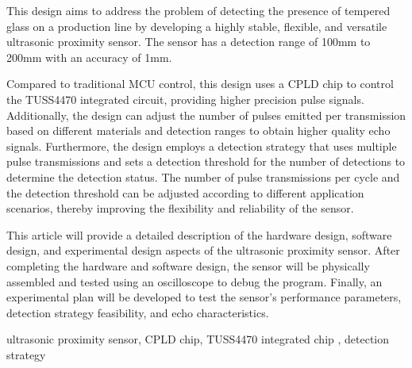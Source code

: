 \begin{EnAbstract}
    

This design aims to address the problem of detecting the presence of tempered glass on a production line by developing a highly stable, flexible, and versatile ultrasonic proximity sensor. The sensor has a detection range of 100mm to 200mm with an accuracy of 1mm.\par
Compared to traditional MCU control, this design uses a CPLD chip to control the TUSS4470 integrated circuit, providing higher precision pulse signals. Additionally, the design can adjust the number of pulses emitted per transmission based on different materials and detection ranges to obtain higher quality echo signals. Furthermore, the design employs a detection strategy that uses multiple pulse transmissions and sets a detection threshold for the number of detections to determine the detection status. The number of pulse transmissions per cycle and the detection threshold can be adjusted according to different application scenarios, thereby improving the flexibility and reliability of the sensor.\par
This article will provide a detailed description of the hardware design, software design, and experimental design aspects of the ultrasonic proximity sensor. After completing the hardware and software design, the sensor will be physically assembled and tested using an oscilloscope to debug the program. Finally, an experimental plan will be developed to test the sensor's performance parameters, detection strategy feasibility, and echo characteristics.
  
  
    \EnglishKeyWord ultrasonic proximity sensor, CPLD chip, TUSS4470 integrated chip , detection strategy
\end{EnAbstract}